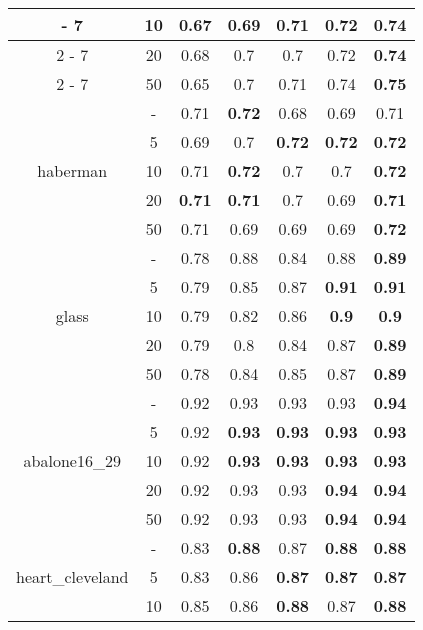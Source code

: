 \begin{table}[H]
\begin{center}
{\begin{tabular}{c|c|ccccc}
{					-%
					7}%
				&10&0.67&0.69&0.71&0.72&\textbf{0.74}\\%
				\cline{2%
					-%
					7}%
				&20&0.68&0.7&0.7&0.72&\textbf{0.74}\\%
				\cline{2%
					-%
					7}%
				&50&0.65&0.7&0.71&0.74&\textbf{0.75}\\%
				\hline%
				\multirow{5}{*}{haberman}&{-}&0.71&\textbf{0.72}&0.68&0.69&0.71\\%
				\cline{2%
					-%
					7}%
				&5&0.69&0.7&\textbf{0.72}&\textbf{0.72}&\textbf{0.72}\\%
				\cline{2%
					-%
					7}%
				&10&0.71&\textbf{0.72}&0.7&0.7&\textbf{0.72}\\%
				\cline{2%
					-%
					7}%
				&20&\textbf{0.71}&\textbf{0.71}&0.7&0.69&\textbf{0.71}\\%
				\cline{2%
					-%
					7}%
				&50&0.71&0.69&0.69&0.69&\textbf{0.72}\\%
				\hline%
				\multirow{5}{*}{glass}&{-}&0.78&0.88&0.84&0.88&\textbf{0.89}\\%
				\cline{2%
					-%
					7}%
				&5&0.79&0.85&0.87&\textbf{0.91}&\textbf{0.91}\\%
				\cline{2%
					-%
					7}%
				&10&0.79&0.82&0.86&\textbf{0.9}&\textbf{0.9}\\%
				\cline{2%
					-%
					7}%
				&20&0.79&0.8&0.84&0.87&\textbf{0.89}\\%
				\cline{2%
					-%
					7}%
				&50&0.78&0.84&0.85&0.87&\textbf{0.89}\\%
				\hline%
				\multirow{5}{*}{abalone16\_29}&{-}&0.92&0.93&0.93&0.93&\textbf{0.94}\\%
				\cline{2%
					-%
					7}%
				&5&0.92&\textbf{0.93}&\textbf{0.93}&\textbf{0.93}&\textbf{0.93}\\%
				\cline{2%
					-%
					7}%
				&10&0.92&\textbf{0.93}&\textbf{0.93}&\textbf{0.93}&\textbf{0.93}\\%
				\cline{2%
					-%
					7}%
				&20&0.92&0.93&0.93&\textbf{0.94}&\textbf{0.94}\\%
				\cline{2%
					-%
					7}%
				&50&0.92&0.93&0.93&\textbf{0.94}&\textbf{0.94}\\%
				\hline%
				\multirow{5}{*}{heart\_cleveland}&{-}&0.83&\textbf{0.88}&0.87&\textbf{0.88}&\textbf{0.88}\\%
				\cline{2%
					-%
					7}%
				&5&0.83&0.86&\textbf{0.87}&\textbf{0.87}&\textbf{0.87}\\%
				\cline{2%
					-%
					7}%
				&10&0.85&0.86&\textbf{0.88}&0.87&\textbf{0.88}\\%

\end{tabular}}
\end{center}
\end{table}
